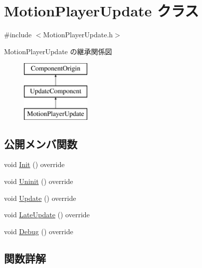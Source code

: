 \hypertarget{class_motion_player_update}{}\section{Motion\+Player\+Update クラス}
\label{class_motion_player_update}


{\ttfamily \#include $<$Motion\+Player\+Update.\+h$>$}

Motion\+Player\+Update の継承関係図\begin{figure}[H]
\begin{center}
\leavevmode
\includegraphics[height=3.000000cm]{class_motion_player_update}
\end{center}
\end{figure}
\subsection*{公開メンバ関数}
\begin{DoxyCompactItemize}
\item 
void \mbox{\hyperlink{class_motion_player_update_aad6398693d592a24998b1efc91058ec3}{Init}} () override
\item 
void \mbox{\hyperlink{class_motion_player_update_a2e896662b3f2bfbe468a6956f5d935bb}{Uninit}} () override
\item 
void \mbox{\hyperlink{class_motion_player_update_a006a6da88cbd4a87da598f806569533a}{Update}} () override
\item 
void \mbox{\hyperlink{class_motion_player_update_a6a6d87142fa9efee8f63cf50fa84cf40}{Late\+Update}} () override
\item 
void \mbox{\hyperlink{class_motion_player_update_a8202bcef585b33bb0ad09b53e2efeee7}{Debug}} () override
\end{DoxyCompactItemize}


\subsection{関数詳解}
\mbox{\label{class_motion_player_update_a8202bcef585b33bb0ad09b53e2efeee7}} 
